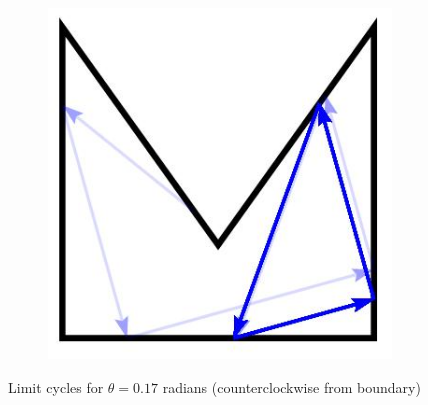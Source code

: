 \documentclass[]{article}  %
\begin{document}
\begin{figure}
\begin{subfigure}{0.33\textwidth}
\end{subfigure}%
\begin{subfigure}{0.33\textwidth}
  \includegraphics[width=\linewidth]{figures/poly2_limit_cycles.jpg}
\end{subfigure}
\caption{Limit cycles for $\theta = 0.17$ radians (counterclockwise from
boundary)}
\end{figure}
\end{document}
